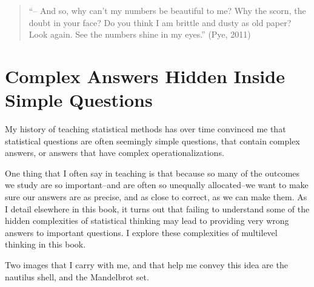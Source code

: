 \documentclass[
  letterpaper,
  DIV=11,
  numbers=noendperiod]{scrreprt}
\begin{document}
\begin{quote}
``-- And so, why can't my numbers be beautiful to me? Why the scorn, the
doubt in your face? Do you think I am brittle and dusty as old paper?
Look again. See the numbers shine in my eyes.'' (Pye, 2011)
\end{quote}

\section{Complex Answers Hidden Inside Simple
Questions}\label{complex-answers-hidden-inside-simple-questions}

My history of teaching statistical methods has over time convinced me
that statistical questions are often seemingly simple questions, that
contain complex answers, or answers that have complex
operationalizations.

One thing that I often say in teaching is that because so many of the
outcomes we study are so important--and are often so unequally
allocated--we want to make sure our answers are as precise, and as close
to correct, as we can make them. As I detail elsewhere in this book, it
turns out that failing to understand some of the hidden complexities of
statistical thinking may lead to providing very wrong answers to
important questions. I explore these complexities of multilevel thinking
in this book.

Two images that I carry with me, and that help me convey this idea are
the nautilus shell, and the Mandelbrot set. 
 
\end{document}
